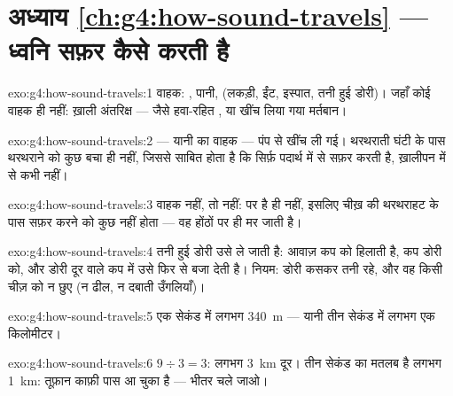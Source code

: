 \section*{अध्याय \ref{ch:g4:how-sound-travels} --- ध्वनि सफ़र कैसे करती है}

\begin{solution}{exo:g4:how-sound-travels:1}
वाहक: , पानी,  (लकड़ी, ईंट, इस्पात, तनी हुई डोरी)। जहाँ कोई
वाहक ही नहीं: ख़ाली अंतरिक्ष --- जैसे हवा-रहित , या  खींच
लिया गया मर्तबान।
\end{solution}

\begin{solution}{exo:g4:how-sound-travels:2}
 --- यानी  का वाहक --- पंप से खींच ली गई। थरथराती घंटी के पास
थरथराने को कुछ बचा ही नहीं, जिससे साबित होता है कि  सिर्फ़
पदार्थ में से सफ़र करती है, ख़ालीपन में से कभी नहीं।
\end{solution}

\begin{solution}{exo:g4:how-sound-travels:3}
वाहक नहीं, तो  नहीं:  पर  है ही नहीं, इसलिए चीख़ की
थरथराहट के पास सफ़र करने को कुछ नहीं होता --- वह होंठों पर ही मर जाती
है।
\end{solution}

\begin{solution}{exo:g4:how-sound-travels:4}
तनी हुई डोरी उसे ले जाती है: आवाज़ कप को हिलाती है, कप डोरी को, और
डोरी दूर वाले कप में उसे फिर से बजा देती है। नियम: डोरी कसकर तनी रहे,
और वह किसी चीज़ को न छुए (न ढील, न दबाती उँगलियाँ)।
\end{solution}

\begin{solution}{exo:g4:how-sound-travels:5}
एक सेकंड में लगभग \qty{340}{m} --- यानी तीन सेकंड में लगभग एक
किलोमीटर।
\end{solution}

\begin{solution}{exo:g4:how-sound-travels:6}
$9 \div 3 = 3$: लगभग \qty{3}{km} दूर। तीन सेकंड का मतलब है लगभग
\qty{1}{km}: तूफ़ान काफ़ी पास आ चुका है --- भीतर चले जाओ।
\end{solution}

